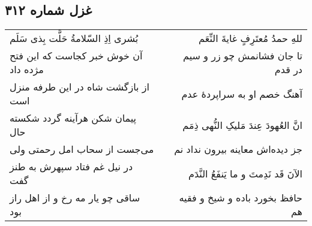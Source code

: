 \begin{center}
\section*{غزل شماره ۳۱۲}
\label{sec:sh312}
\begin{longtable}{l p{0.5cm} r}
بُشری اِذِ السّلامةُ حَلَّت بِذی سَلَم
&&
للهِ حمدُ مُعتَرِفٍ غایةَ النِّعَم
\\
آن خوش خبر کجاست که این فتح مژده داد
&&
تا جان فشانمش چو زر و سیم در قدم
\\
از بازگشت شاه در این طرفه منزل است
&&
آهنگ خصم او به سراپردهٔ عدم
\\
پیمان شکن هرآینه گردد شکسته حال
&&
انَّ العُهودَ عِندَ مَلیکِ النُّهی ذِمَم
\\
می‌جست از سحاب امل رحمتی ولی
&&
جز دیده‌اش معاینه بیرون نداد نم
\\
در نیل غم فتاد سپهرش به طنز گفت
&&
الآنَ قَد نَدِمتَ و ما یَنفَعُ النَّدَم
\\
ساقی چو یار مه رخ و از اهل راز بود
&&
حافظ بخورد باده و شیخ و فقیه هم
\\
\end{longtable}
\end{center}
